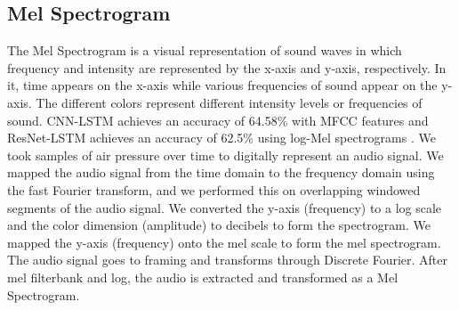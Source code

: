     \subsection{Mel Spectrogram}
    The Mel Spectrogram is a visual representation of sound waves in which frequency and intensity are represented by the x-axis and y-axis, respectively. In it, time appears on the x-axis while various frequencies of sound appear on the y-axis. The different colors represent different intensity levels or frequencies of sound. CNN-LSTM achieves an accuracy of 64.58\% with MFCC features and ResNet-LSTM achieves an accuracy of 62.5\% using log-Mel spectrograms \parencite{16}. We took samples of air pressure over time to digitally represent an audio signal. We mapped the audio signal from the time domain to the frequency domain using the fast Fourier transform, and we performed this on overlapping windowed segments of the audio signal. We converted the y-axis (frequency) to a log scale and the color dimension (amplitude) to decibels to form the spectrogram. We mapped the y-axis (frequency) onto the mel scale to form the mel spectrogram. The audio signal goes to framing and transforms through Discrete Fourier. After mel filterbank and log, the audio is extracted and transformed as a Mel Spectrogram. 
